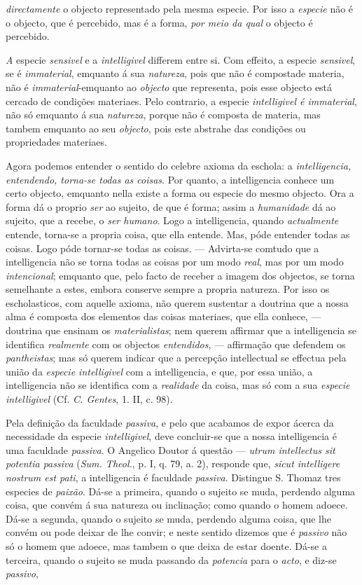 \emph{directamente} o objecto representado pela mesma especie. Por isso a \emph{especie} não é o objecto, que é percebido, mas é a forma, \emph{por meio da qual} o objecto é percebido.\par \emph{A} especie \emph{sensivel} e a \emph{intelligivel} differem entre si. Com effeito, a especie \emph{sensivel}, se é \emph{immaterial}, emquanto á sua \emph{natureza}, pois que não é compostade materia, não é \emph{immaterial}-emquanto ao \emph{objecto} que representa, pois esse objecto está cercado de condições materiaes. Pelo contrario, a especie \emph{intelligivel é immaterial}, não só emquanto á sua \emph{natureza}, porque não é composta de materia, mas tambem emquanto ao seu \emph{objecto}, pois este abstrahe das condições ou propriedades materiaes.\par Agora podemos entender o sentido do celebre axioma da eschola: a \emph{intelligencia, entendendo, torna-se todas as coisas}. Por quanto, a intelligencia conhece um certo objecto, emquanto nella existe a forma ou especie do mesmo objecto. Ora a forma dá o proprio \emph{ser} ao sujeito, de que é forma; assim a \emph{humanidade} dá ao sujeito, que a recebe, o \emph{ser humano}. Logo a intelligencia, quando \emph{actualmente} entende, torna-se a propria coisa, que ella entende. Mas, póde entender todas as coisas. Logo póde tornar-se todas as coisas. --- Advirta-se comtudo que a intelligencia não se torna todas as coisas por um modo \emph{real}, mas por um modo \emph{intencional}; emquanto que, pelo facto de receber a imagem dos objectos, se torna semelhante a estes, embora conserve sempre a propria natureza. Por isso os escholasticos, com aquelle axioma, não querem sustentar a doutrina que a nossa alma é composta dos elementos das coisas materiaes, que ella conhece, --- doutrina que ensinam os \emph{materialistas}; nem querem affirmar que a intelligencia se identifica \emph{realmente} com os objectos \emph{entendidos}, --- affirmação que defendem os \emph{pantheistas}; mas só querem indicar que a percepção intellectual se effectua pela união da \emph{especie intelligivel} com a intelligencia, e que, por essa união, a intelligencia não se identifica com a \emph{realidade} da coisa, mas só com a sua \emph{especie intelligivel} (Cf. \emph{C. Gentes}, 1. II, c. 98).\par Pela definição da faculdade \emph{passiva}, e pelo que acabamos de expor ácerca da necessidade da especie \emph{intelligivel}, deve concluir-se que a nossa intelligencia é uma faculdade \emph{passiva}. O Angelico Doutor á questão --- \emph{utrum intellectus sit potentia passiva} (\emph{Sum. Theol.}, p. I, q. 79, a. 2), responde que, \emph{sicut intelligere nostrum est pati}, a intelligencia é faculdade \emph{passiva}. Distingue S. Thomaz tres especies de \emph{paixão}. Dá-se a primeira, quando o sujeito se muda, perdendo alguma coisa, que convém á sua natureza ou inclinação; como quando o homem adoece. Dá-se a segunda, quando o sujeito se muda, perdendo alguma coisa, que lhe convém ou pode deixar de lhe convir; e neste sentido dizemos que é \emph{passivo} não só o homem que adoece, mas tambem o que deixa de estar doente. Dá-se a terceira, quando o sujeito se muda passando da \emph{potencia} para o \emph{acto}, e diz-se \emph{passivo}, 